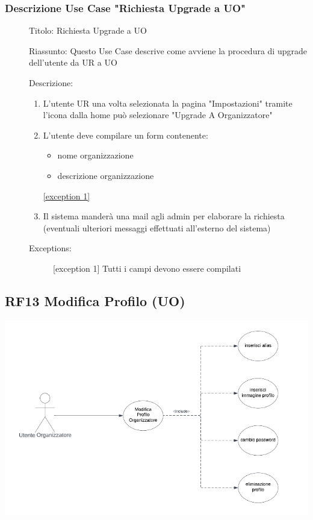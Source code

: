 \documentclass{article}
\begin{document}
\subsubsection*{Descrizione Use Case "Richiesta Upgrade a UO"}
\begin{description}
    \item[] Titolo: Richiesta Upgrade a UO
    \item[] Riassunto: Questo Use Case descrive come avviene la procedura di upgrade dell'utente da UR a UO
    \item[] Descrizione:
        \begin{enumerate}
            \item L'utente UR una volta selezionata la pagina "Impostazioni" tramite l'icona  dalla home può selezionare "Upgrade A Organizzatore"
            \item L'utente deve compilare un form contenente:
                  \begin{itemize}
                      \item nome organizzazione
                      \item descrizione organizzazione
                  \end{itemize}
                  \hyperref[exc:14.1]{[exception 1]}
            \item Il sistema manderà una mail agli admin per elaborare la richiesta (eventuali ulteriori messaggi effettuati all'esterno del sistema)
        \end{enumerate}
    \item[] Exceptions:
        \begin{description}
            \item[] \label{exc:14.1} [exception 1] Tutti i campi devono essere compilati
        \end{description}
\end{description}
\clearpage
\subsection{RF13 Modifica Profilo (UO)}
\begin{center}
    \item[] \includegraphics[scale=0.5]{UseCase_6.png}
\end{center}
\end{document}
